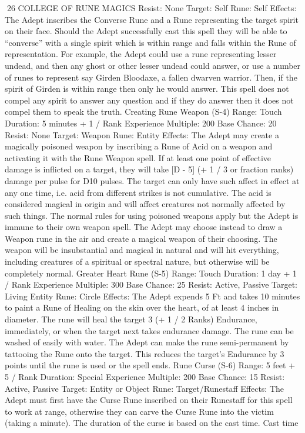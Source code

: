 \documentclass[a4paper]{article}
\begin{document}
\begin{multicols}{3}
26 COLLEGE OF RUNE MAGICS
Resist: None
Target: Self
Rune: Self
Effects: The Adept inscribes the Converse Rune
and a Rune representing the target spirit on their
face. Should the Adept successfully cast this spell
they will be able to “converse” with a single spirit
which is within range and falls within the Rune of
representation. For example, the Adept could use a
rune representing lesser undead, and then any ghost
or other lesser undead could answer, or use a number of runes to represent say Girden Bloodaxe, a
fallen dwarven warrior. Then, if the spirit of Girden is within range then only he would answer.
This spell does not compel any spirit to answer any
question and if they do answer then it does not
compel them to speak the truth.
Creating Rune Weapon (S-4)
Range: Touch
Duration: 5 minutes + 1 / Rank
Experience Multiple: 200
Base Chance: 20%
Resist: None
Target: Weapon
Rune: Entity
Effects: The Adept may create a magically poisoned weapon by inscribing a Rune of Acid on a
weapon and activating it with the Rune Weapon
spell. If at least one point of effective damage is
inflicted on a target, they will take [D - 5] (+ 1 / 3
or fraction ranks) damage per pulse for D10 pulses.
The target can only have such affect in effect at
any one time, i.e. acid from different strikes is not
cumulative. The acid is considered magical in
origin and will affect creatures not normally affected by such things. The normal rules for using
poisoned weapons apply but the Adept is immune
to their own weapon spell.
The Adept may choose instead to draw a Weapon
rune in the air and create a magical weapon of their
choosing. The weapon will be insubstantial and
magical in natural and will hit everything, including creatures of a spiritual or spectral nature, but
otherwise will be completely normal.
Greater Heart Rune (S-5)
Range: Touch
Duration: 1 day + 1 / Rank
Experience Multiple: 300
Base Chance: 25%
Resist: Active, Passive
Target: Living Entity
Rune: Circle
Effects: The Adept expends 5 Ft and takes 10 minutes to paint a Rune of Healing on the skin over the
heart, of at least 4 inches in diameter. The rune will
heal the target 3 (+ 1 / 2 Ranks) Endurance, immediately, or when the target next takes endurance
damage. The rune can be washed of easily with
water.
The Adept can make the rune semi-permanent by
tattooing the Rune onto the target. This reduces the
target’s Endurance by 3 points until the rune is
used or the spell ends.
Rune Curse (S-6)
Range: 5 feet + 5 / Rank
Duration: Special
Experience Multiple: 200
Base Chance: 15%
Resist: Active, Passive
Target: Entity or Object
Rune: Target/Runestaff
Effects: The Adept must first have the Curse Rune
inscribed on their Runestaff for this spell to work
at range, otherwise they can carve the Curse Rune
into the victim (taking a minute). The duration of
the curse is based on the cast time.
Cast time


\end{multicols}
\end{document}

